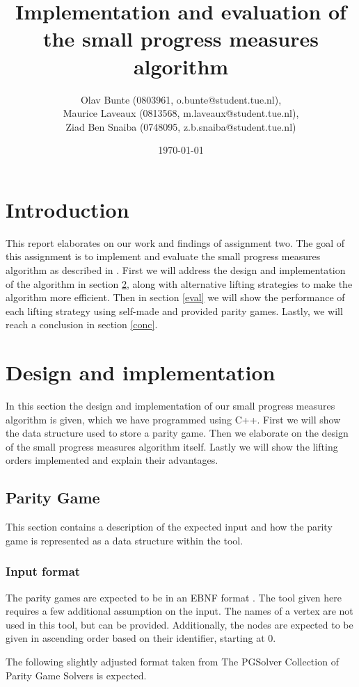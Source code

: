 \documentclass[10pt,a4paper]{article}
\title{Implementation and evaluation of the small progress measures algorithm}
\author{Olav Bunte (0803961, o.bunte@student.tue.nl),\\
Maurice Laveaux (0813568, m.laveaux@student.tue.nl),\\
Ziad Ben Snaiba (0748095, z.b.snaiba@student.tue.nl)}
\date{\today}
\begin{document}
\maketitle

\section{Introduction}
This report elaborates on our work and findings of assignment two. The goal of this assignment is to implement and evaluate the small progress measures algorithm as described in \cite{spmpaper}. First we will address the design and implementation of the algorithm in section \ref{design}, along with alternative lifting strategies to make the algorithm more efficient. Then in section \ref{eval} we will show the performance of each lifting strategy using self-made and provided parity games. Lastly, we will reach a conclusion in section \ref{conc}.

\section{Design and implementation}\label{design}
In this section the design and implementation of our small progress measures algorithm is given, which we have programmed using C++. First we will show the data structure
used to store a parity game. Then we elaborate on the design of the small progress measures algorithm itself. Lastly we will show the lifting orders implemented and explain their advantages.

\subsection{Parity Game}
This section contains a description of the expected input and how the parity game is represented as a data structure within the tool.

\subsubsection{Input format}
The parity games are expected to be in an EBNF format \cite{pgsreport}. The tool given here requires a few additional assumption on the input. The names of a vertex are not used in this tool, but can be provided. Additionally, the nodes are expected to be given in ascending order based on their identifier, starting at 0. 

The following slightly adjusted format taken from The PGSolver Collection of Parity Game Solvers \cite{pgsreport} is expected.
\end{document}
